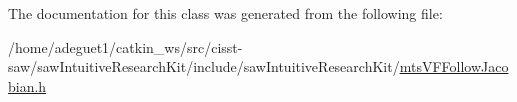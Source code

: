 The documentation for this class was generated from the following file\-:\begin{DoxyCompactItemize}
\item 
/home/adeguet1/catkin\-\_\-ws/src/cisst-\/saw/saw\-Intuitive\-Research\-Kit/include/saw\-Intuitive\-Research\-Kit/\hyperlink{mts_v_f_follow_jacobian_8h}{mts\-V\-F\-Follow\-Jacobian.\-h}\end{DoxyCompactItemize}
